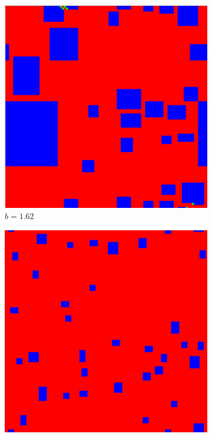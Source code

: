 \documentclass[12pt]{article}
\begin{document}
\begin{figure}[!htbp]
        \begin{subfigure}{.33\textwidth}
          \centering
          \includegraphics[width=.9\linewidth]{MeanFieldGame/snapshot_b=162.jpg}
          \caption{$b=1.62$}
          \label{fig:sub7}
        \end{subfigure}%
        \begin{subfigure}{.33\textwidth}
          \centering
          \includegraphics[width=.9\linewidth]{MeanFieldGame/snapshot_b=17.jpg}

\end{subfigure}
\end{figure}
\end{document}
